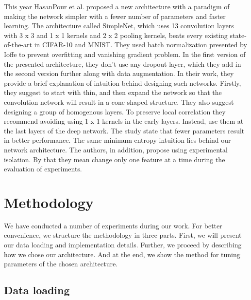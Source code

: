 \documentclass{IEEEtran}
\begin{document}
This year HasanPour et al. \cite{DBLP:journals/corr/HasanPourRVS16} proposed a new architecture with a paradigm of making the network simpler with a fewer number of parameters and faster learning. The architecture called SimpleNet, which uses 13 convolution layers with 3 x 3 and 1 x 1 kernels and 2 x 2 pooling kernels, beats every existing state-of-the-art in CIFAR-10 and MNIST. They used batch normalization presented by Ioffe \cite{Ioffe:2015:BNA:3045118.3045167} to prevent overfitting and vanishing gradient problem. In the first version of the presented architecture, they don't use any dropout layer, which they add in the second version further along with data augmentation. In their work, they provide a brief explanation of intuition behind designing such networks. Firstly, they suggest to start with thin, and then expand the network so that the convolution network will result in a cone-shaped structure. They also suggest designing a group of homogenous layers. To preserve local correlation they recommend avoiding using 1 x 1 kernels in the early layers. Instead, use them at the last layers of the deep network. The study state that fewer parameters result in better performance. The same minimum entropy intuition lies behind our network architecture. The authors, in addition, propose using experimental isolation. By that they mean change only one feature at a time during the evaluation of experiments.


\section{Methodology}
We have conducted a number of experiments during our work. For better convenience, we structure the methodology in three parts. First, we will present our data loading and implementation details. Further, we proceed by describing how we chose our architecture. And at the end, we show the method for tuning parameters of the chosen architecture.

\subsection{Data loading}
\end{document}
